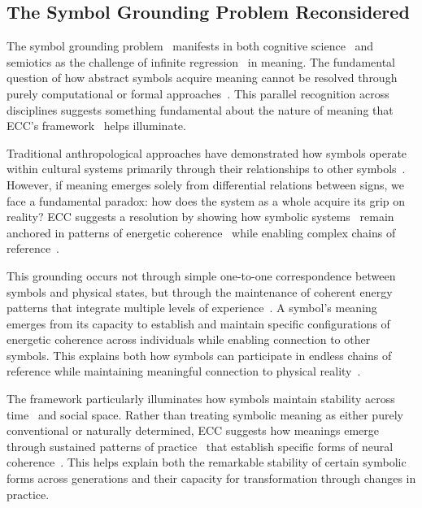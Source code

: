 \subsection*{The Symbol Grounding Problem Reconsidered}

The symbol grounding problem~ manifests in both cognitive science~ and semiotics as the challenge of infinite regression~ in meaning. The fundamental question of how abstract symbols acquire meaning cannot be resolved through purely computational or formal approaches~\cite{harnad1990symbol}. This parallel recognition across disciplines suggests something fundamental about the nature of meaning that ECC's framework~ helps illuminate.

Traditional anthropological approaches have demonstrated how symbols operate within cultural systems primarily through their relationships to other symbols~\cite{saussure1983course}. However, if meaning emerges solely from differential relations between signs, we face a fundamental paradox: how does the system as a whole acquire its grip on reality? ECC suggests a resolution by showing how symbolic systems~ remain anchored in patterns of energetic coherence~ while enabling complex chains of reference~.

This grounding occurs not through simple one-to-one correspondence between symbols and physical states, but through the maintenance of coherent energy patterns that integrate multiple levels of experience~\cite{lakoff1999philosophy,ingold2011being}. A symbol's meaning~ emerges from its capacity to establish and maintain specific configurations of energetic coherence across individuals while enabling connection to other symbols. This explains both how symbols can participate in endless chains of reference while maintaining meaningful connection to physical reality~\cite{peirce1931collected,keane2003semiotics}.

The framework particularly illuminates how symbols maintain stability across time~ and social space. Rather than treating symbolic meaning as either purely conventional or naturally determined, ECC suggests how meanings emerge through sustained patterns of practice~ that establish specific forms of neural coherence~\cite{barsalou1999perceptual,toren1999mind}. This helps explain both the remarkable stability of certain symbolic forms across generations and their capacity for transformation through changes in practice.

